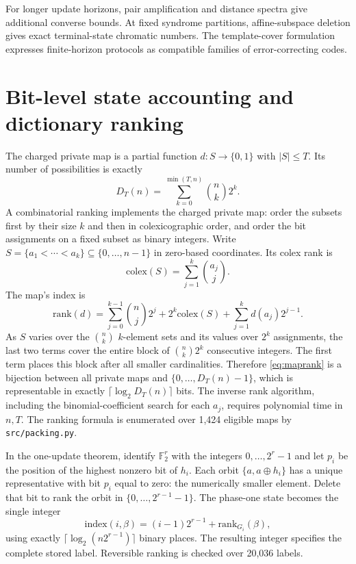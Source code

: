\documentclass[11pt,a4paper]{article}
\newcommand{\F}{\mathbb F_2}
\begin{document}
For longer update horizons, pair amplification and distance spectra give additional converse bounds. At fixed syndrome partitions, affine-subspace deletion gives exact terminal-state chromatic numbers. The template-cover formulation expresses finite-horizon protocols as compatible families of error-correcting codes.

\appendix

\section{Bit-level state accounting and dictionary ranking}
The charged private map is a partial function $d:S\to\{0,1\}$ with $|S|\le T$. Its number of possibilities is exactly
\[
D_T(n)=\sum_{k=0}^{\min(T,n)}\binom nk2^k.
\]
A combinatorial ranking implements the charged private map: order the subsets first by their size $k$ and then in colexicographic order, and order the bit assignments on a fixed subset as binary integers. Write $S=\{a_1<\cdots<a_k\}\subseteq\{0,\ldots,n-1\}$ in zero-based coordinates. Its colex rank is
\[
 \mathrm{colex}(S)=\sum_{j=1}^k\binom{a_j}{j}.
\]
The map's index is
\begin{equation}\label{eq:maprank}
\mathrm{rank}(d)=\sum_{j=0}^{k-1}\binom nj2^j
  + 2^k\mathrm{colex}(S)+\sum_{j=1}^{k}d(a_j)2^{j-1}.
\end{equation}
As $S$ varies over the $\binom nk$ $k$-element sets and its values over $2^k$ assignments, the last two terms cover the entire block of $\binom nk2^k$ consecutive integers. The first term places this block after all smaller cardinalities. Therefore \eqref{eq:maprank} is a bijection between all private maps and $\{0,\ldots,D_T(n)-1\}$, which is representable in exactly $\lceil\log_2D_T(n)\rceil$ bits. The inverse rank algorithm, including the binomial-coefficient search for each $a_j$, requires polynomial time in $n,T$. The ranking formula is enumerated over 1,424 eligible maps by \texttt{src/packing.py}.

In the one-update theorem, identify $\F^r$ with the integers $0,\ldots,2^r-1$ and let $p_i$ be the position of the highest nonzero bit of $h_i$. Each orbit $\{a,a\oplus h_i\}$ has a unique representative with bit $p_i$ equal to zero: the numerically smaller element. Delete that bit to rank the orbit in $\{0,\ldots,2^{r-1}-1\}$. The phase-one state becomes the single integer
\[
 \mathrm{index}(i,\beta)=(i-1)2^{r-1}+\mathrm{rank}_{G_i}(\beta),
\]
using exactly $\lceil\log_2(n2^{r-1})\rceil$ binary places. The resulting integer specifies the complete stored label. Reversible ranking is checked over 20,036 labels.
\end{document}
